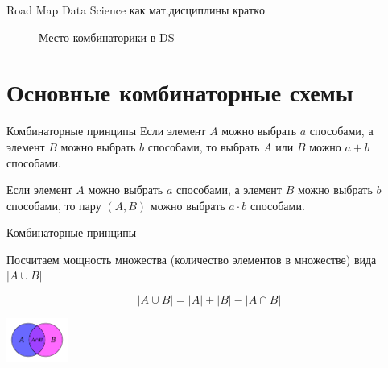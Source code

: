 \begin{frame}
	Road Map Data Science как мат.дисциплины \(кратко\)
	\begin{center}
		\begin{figure}
			
			\caption{Место комбинаторики в DS}
		\end{figure}	
	\end{center}
	
\end{frame}

\section{Основные комбинаторные схемы}\label{section:main_combinatorics_sxems}

\begin{frame}{Комбинаторные принципы}
Если элемент $A$ можно выбрать $a$ способами,
а элемент $B$ можно выбрать $b$ способами,
то выбрать $A$ или $B$ 
можно $a+b$ способами.

Если элемент $A$ можно выбрать $a$ способами,
а элемент $B$ можно выбрать $b$ способами,
то пару $(A, B)$ 
можно выбрать $a \cdot b$ способами.

\end{frame}

\begin{frame}{Комбинаторные принципы}


Посчитаем мощность множества (количество элементов в множестве)
вида $\left| A \cup B \right|$

\begin{equation}
\left| A \cup B \right| = \left|  A \right| + \left|  B \right| - \left| A \cap B \right|
\end{equation}

\centering
	\includegraphics[width=2cm]{../pic/A_intersect_B.svg.png}

\end{frame}

